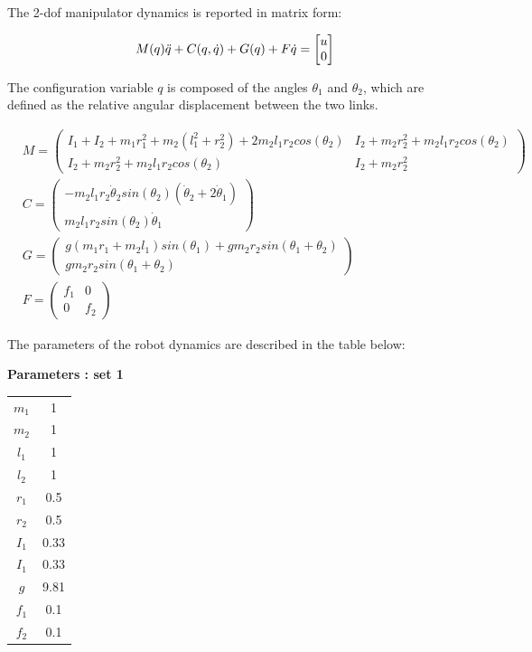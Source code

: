 \documentclass[a4paper,11pt,oneside]{book}
\begin{document}
The 2-dof manipulator dynamics is reported in matrix form: 

\begin{equation}\label{robot dynamics}
    M(q)\Ddot{q} + C(q,\Dot{q}) + G(q) + F\Dot{q} = \begin{bmatrix}
        u \\ 0
    \end{bmatrix}
\end{equation}

The configuration variable $q$ is composed of the angles $\theta_1$ and $\theta_2$, which are defined as the relative angular displacement between the two links.

\begin{equation*}
    \begin{aligned}
    &M = \begin{pmatrix}
        I_1 + I_2 + m_1r_1^2 + m_2(l_1^2 + r_2^2) + 2m_2l_1r_2cos(\theta_2) & I_2 + m_2r_2^2 + m_2l_1r_2cos(\theta_2) \\
        I_2 + m_2r_2^2 + m_2l_1r_2cos(\theta_2) & I_2 + m_2r_2^2
    \end{pmatrix}\\
    & C = \begin{pmatrix}
        -m_2l_1r_2\Dot{\theta}_2sin(\theta_2)(\Dot{\theta}_2 + 2\Dot{\theta}_1) \\
        m_2l_1r_2sin(\theta_2)\Dot{\theta}_1
    \end{pmatrix}\\
    & G = \begin{pmatrix}
       g(m_1r_1 + m_2l_1)sin(\theta_1) + gm_2r_2sin(\theta_1 + \theta_2) \\
       gm_2r_2sin(\theta_1 + \theta_2)
    \end{pmatrix}\\
    & F = \begin{pmatrix}
        f_1 & 0 \\ 0 & f_2
    \end{pmatrix}
    \end{aligned}
\end{equation*}


The parameters of the robot dynamics are described in the table below:

\begin{center}
    \textbf{Parameters : set 1}\\
    \vspace{0.2cm}
    \begin{tabular}{c|c}
    \hline
    $m_1$ & 1 \\
    $m_2$ & 1 \\
    $l_1$ & 1 \\
    $l_2$ & 1 \\
    $r_1$ & 0.5 \\
    $r_2$ & 0.5 \\
    $I_1$ & 0.33 \\
    $I_1$ & 0.33 \\
    $g$ & 9.81 \\
    $f_1$ & 0.1 \\
    $f_2$ & 0.1 
\end{tabular}
\end{center}
 
\end{document}
